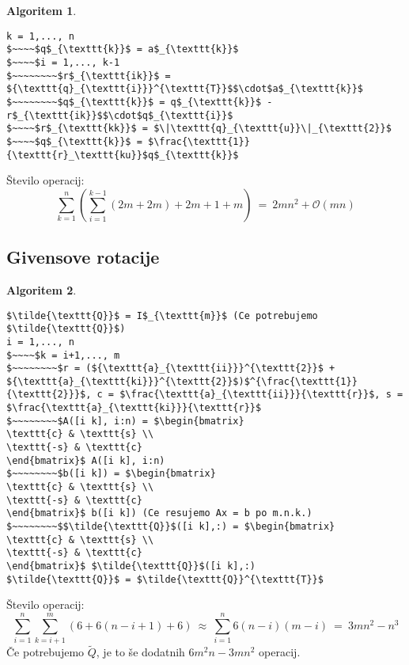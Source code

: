 \documentclass[11pt]{article}
\theoremstyle{definition}
\newtheorem*{algoritem}{Algoritem}
\begin{document}
\begin{algoritem}
~
\begin{lstlisting}
k = 1,..., n
$~~~~$q$_{\texttt{k}}$ = a$_{\texttt{k}}$
$~~~~$i = 1,..., k-1
$~~~~~~~~$r$_{\texttt{ik}}$ = ${\texttt{q}_{\texttt{i}}}^{\texttt{T}}$$\cdot$a$_{\texttt{k}}$
$~~~~~~~~$q$_{\texttt{k}}$ = q$_{\texttt{k}}$ - r$_{\texttt{ik}}$$\cdot$q$_{\texttt{i}}$ 
$~~~~$r$_{\texttt{kk}}$ = $\|\texttt{q}_{\texttt{u}}\|_{\texttt{2}}$
$~~~~$q$_{\texttt{k}}$ = $\frac{\texttt{1}}{\texttt{r}_\texttt{ku}}$q$_{\texttt{k}}$
\end{lstlisting}
Število operacij:
$$\sum_{k=1}^n \left( \sum_{i=1}^{k-1} (2m + 2m) + 2m + 1 + m \right) ~=~ 2mn^2 + \mathcal{O}(mn)$$

\end{algoritem}
\vspace{0.5cm}


\subsection{Givensove rotacije}
\vspace{0.5cm}

\begin{algoritem}
~
\begin{lstlisting}
$\tilde{\texttt{Q}}$ = I$_{\texttt{m}}$ (Ce potrebujemo $\tilde{\texttt{Q}}$)
i = 1,..., n
$~~~~$k = i+1,..., m
$~~~~~~~~$r = (${\texttt{a}_{\texttt{ii}}}^{\texttt{2}}$ + ${\texttt{a}_{\texttt{ki}}}^{\texttt{2}}$)$^{\frac{\texttt{1}}{\texttt{2}}}$, c = $\frac{\texttt{a}_{\texttt{ii}}}{\texttt{r}}$, s = $\frac{\texttt{a}_{\texttt{ki}}}{\texttt{r}}$
$~~~~~~~~$A([i k], i:n) = $\begin{bmatrix}
\texttt{c} & \texttt{s} \\
\texttt{-s} & \texttt{c}
\end{bmatrix}$ A([i k], i:n)
$~~~~~~~~$b([i k]) = $\begin{bmatrix}
\texttt{c} & \texttt{s} \\
\texttt{-s} & \texttt{c}
\end{bmatrix}$ b([i k]) (Ce resujemo Ax = b po m.n.k.)
$~~~~~~~~$$\tilde{\texttt{Q}}$([i k],:) = $\begin{bmatrix}
\texttt{c} & \texttt{s} \\
\texttt{-s} & \texttt{c}
\end{bmatrix}$ $\tilde{\texttt{Q}}$([i k],:)
$\tilde{\texttt{Q}}$ = $\tilde{\texttt{Q}}^{\texttt{T}}$
\end{lstlisting}
Število operacij:
$$\sum_{i=1}^n \sum_{k=i+1}^m \left(6 + 6(n-i+1) + 6 \right) ~\approx~ \sum_{i=1}^n 6(n-i)(m-i) ~=~ 3mn^2 - n^3$$
Če potrebujemo $\tilde{Q}$, je to še dodatnih $6m^2n - 3mn^2$ operacij.

\end{algoritem}
\vspace{0.5cm}
\end{document}
